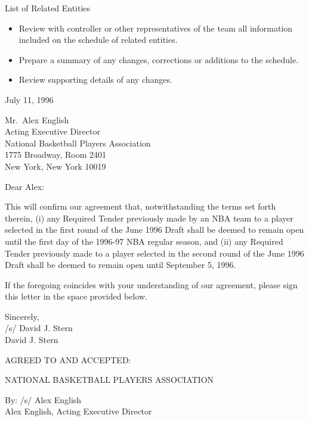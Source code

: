 \documentclass[
]{book}
\providecommand{\tightlist}{%
  \setlength{\itemsep}{0pt}\setlength{\parskip}{0pt}}
\begin{document}
List of Related Entities

\begin{itemize}
\tightlist
\item
  Review with controller or other representatives of the team all information included on the schedule of related entities.
\item
  Prepare a summary of any changes, corrections or additions to the schedule.
\item
  Review supporting details of any changes.
\end{itemize}

\newpage

July 11, 1996

Mr.~Alex English\\
Acting Executive Director\\
National Basketball Players Association\\
1775 Broadway, Room 2401\\
New York, New York 10019

Dear Alex:

This will confirm our agreement that, notwithstanding the terms set forth therein, (i) any Required Tender previously made by an NBA team to a player selected in the first round of the June 1996 Draft shall be deemed to remain open until the first day of the 1996-97 NBA regular season, and (ii) any Required Tender previously made to a player selected in the second round of the June 1996 Draft shall be deemed to remain open until September 5, 1996.

If the foregoing coincides with your understanding of our agreement, please sign this letter in the space provided below.

Sincerely,\\
/s/ David J. Stern\\
David J. Stern

AGREED TO AND ACCEPTED:

NATIONAL BASKETBALL PLAYERS ASSOCIATION

By:
/s/ Alex English\\
Alex English, Acting Executive Director
\end{document}
